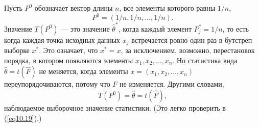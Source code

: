 Пусть $P^{0}$ обозначает вектор длины $n$, все элементы которого равны $1/n$,
\begin{equation}\label{eq10.21}
   P^{0} = (1/n, 1/n, \dots, 1/n).
\end{equation}
Значение $T(P^{0})$ --- это значение $\hat{\theta}^{*}$, когда каждый элемент $P_{j}^{*} = 1/n$, то есть когда каждая точка исходных данных $x_j$ встречается ровно один раз в бутстреп выборке $x^{*}$. Это означает, что $x^{*} = x$, за исключением, возможно, перестановок порядка, в котором появляются элементы $x_{1}, x_{2}, \dots, x_{n}$. Но статистика вида $\hat{\theta} = t(\hat{F})$ не меняется, когда элементы $x = (x_1, x_2, \dots, x_n)$ переупорядочиваются, потому что $F$ не изменяется. Другими словами,
\begin{equation}\label{eq10.22}
   T(P^{0}) = \hat{\theta} = t(\hat{F}),
\end{equation}
наблюдаемое выборочное значение статистики. (Это легко проверить в (\ref{eq10.19}).)


